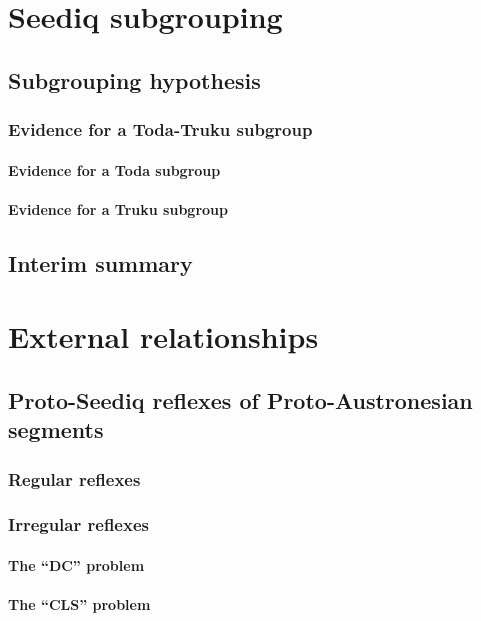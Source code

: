 \documentclass[master]{NTHUthesis}
\begin{document}
\chapter{Seediq subgrouping}

\section{Subgrouping hypothesis}
\lipsum[1]
\subsection{Evidence for a Toda-Truku subgroup}
\lipsum[1]
\subsubsection{Evidence for a Toda subgroup}
\lipsum[1]
\subsubsection{Evidence for a Truku subgroup}
\lipsum[1]

\section{Interim summary}
\lipsum[1]

\chapter{External relationships}

\section{Proto-Seediq reflexes of Proto-Austronesian segments}
\lipsum[1]
\subsection{Regular reflexes}
\lipsum[1]
\subsection{Irregular reflexes}
\lipsum[1]
\subsubsection{The ``DC'' problem}
\lipsum[1]
\subsubsection{The ``CLS'' problem}
\lipsum[1]
\end{document}
